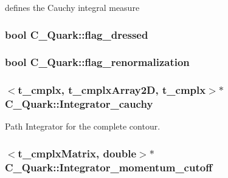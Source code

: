 defines the Cauchy integral measure 

\hypertarget{class_c___quark_a88da2d4e54ff2d0194691e9ebf0313cc}{
\subsubsection[{flag\-\_\-dressed}]{\setlength{\rightskip}{0pt plus 5cm}bool C\-\_\-\-Quark\-::flag\-\_\-dressed\hspace{0.3cm}{\ttfamily [protected]}}}\label{class_c___quark_a88da2d4e54ff2d0194691e9ebf0313cc}
\hypertarget{class_c___quark_ab74616977c12b63b1bb3937656b2a580}{
\subsubsection[{flag\-\_\-renormalization}]{\setlength{\rightskip}{0pt plus 5cm}bool C\-\_\-\-Quark\-::flag\-\_\-renormalization\hspace{0.3cm}{\ttfamily [protected]}}}\label{class_c___quark_ab74616977c12b63b1bb3937656b2a580}
\hypertarget{class_c___quark_aaa4541680e33e880aa95591e9df3be44}{
\subsubsection[{Integrator\-\_\-cauchy}]{$<${\bf t\-\_\-cmplx}, {\bf t\-\_\-cmplx\-Array2\-D}, {\bf t\-\_\-cmplx}$>$$\ast$ C\-\_\-\-Quark\-::\-Integrator\-\_\-cauchy\hspace{0.3cm}{\ttfamily [protected]}}}\label{class_c___quark_aaa4541680e33e880aa95591e9df3be44}


Path Integrator for the complete contour. 

\hypertarget{class_c___quark_a551a3fc5de8f8b4d8bcb2502b503df41}{
\subsubsection[{Integrator\-\_\-momentum\-\_\-cutoff}]{$<${\bf t\-\_\-cmplx\-Matrix}, double$>$$\ast$ C\-\_\-\-Quark\-::\-Integrator\-\_\-momentum\-\_\-cutoff\hspace{0.3cm}{\ttfamily [protected]}}}\label{class_c___quark_a551a3fc5de8f8b4d8bcb2502b503df41}


